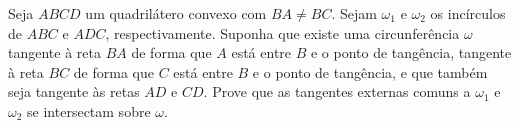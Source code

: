 Seja $ABCD$ um quadrilátero convexo com $BA\neq BC$. Sejam $\omega_1$ e $\omega_2$ os incírculos de $ABC$ e $ADC$, respectivamente. Suponha que existe uma circunferência $\omega$ tangente à reta $BA$ de forma que $A$ está entre $B$ e o ponto de tangência, tangente à reta $BC$ de forma que $C$ está entre $B$ e o ponto de tangência, e que também seja tangente às retas $AD$ e $CD$. Prove que as tangentes externas comuns a $\omega_{1}$ e $\omega_{2}$ se intersectam sobre $\omega$.
